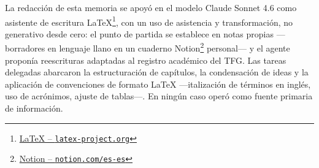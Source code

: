 La redacción de esta memoria se apoyó en el modelo Claude Sonnet 4.6 como asistente de escritura LaTeX\footnote{\href{https://www.latex-project.org}{LaTeX -- \texttt{latex-project.org}}}, con un uso de asistencia y transformación, no generativo desde cero: el punto de partida se establece en notas propias ---borradores en lenguaje llano en un cuaderno Notion\footnote{\href{https://www.notion.com/es-es}{Notion -- \texttt{notion.com/es-es}}} personal--- y el agente proponía reescrituras adaptadas al registro académico del \ac{TFG}. Las tareas delegadas abarcaron la estructuración de capítulos, la condensación de ideas y la aplicación de convenciones de formato LaTeX ---italización de términos en inglés, uso de acrónimos, ajuste de tablas---. En ningún caso operó como fuente primaria de información.